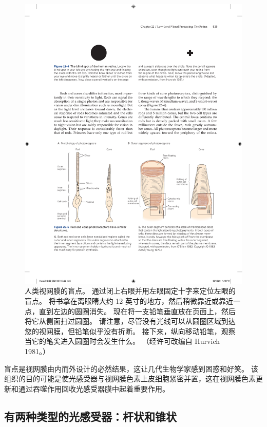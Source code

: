 \begin{figure}[htbp]
	\centering
	\includegraphics[width=1.0\linewidth]{chap22/fig_22_4}
	\caption{人类视网膜的盲点。 
		通过闭上右眼并用左眼固定十字来定位左眼的盲点。 
		将书拿在离眼睛大约 12 英寸的地方，然后稍微靠近或靠近一点，直到左边的圆圈消失。 
		现在将一支铅笔垂直放在页面上，然后将它从侧面扫过圆圈。 
		请注意，尽管没有光线可以从圆圈区域到达您的视网膜，但铅笔似乎没有折断。 
		接下来，纵向移动铅笔，观察当它的笔尖进入圆圈时会发生什么。 （经许可改编自 Hurvich 1981。）}
	\label{fig:22_4}
\end{figure}


盲点是视网膜由内而外设计的必然结果，这让几代生物学家感到困惑和好笑。 
该组织的目的可能是使光感受器与视网膜色素上皮细胞紧密并置，这在视网膜色素更新和通过吞噬作用回收光感受器膜中起着重要作用。


\subsection{有两种类型的光感受器：杆状和锥状}

